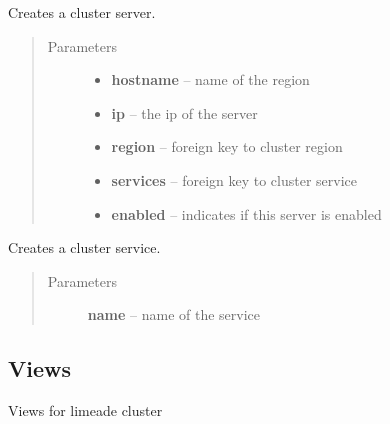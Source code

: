 \documentclass[letterpaper,10pt,english]{sphinxmanual}
\begin{document}
\begin{fulllineitems}
\label{api/cluster:limeade.cluster.models.Server}
Creates a cluster server.
\begin{quote}\begin{description}
\item[{Parameters}] \leavevmode\begin{itemize}
\item {} 
\textbf{hostname} -- name of the region

\item {} 
\textbf{ip} -- the ip of the server

\item {} 
\textbf{region} -- foreign key to cluster region

\item {} 
\textbf{services} -- foreign key to cluster service

\item {} 
\textbf{enabled} -- indicates if this server is enabled

\end{itemize}

\end{description}\end{quote}

\end{fulllineitems}


\begin{fulllineitems}
\label{api/cluster:limeade.cluster.models.Service}
Creates a cluster service.
\begin{quote}\begin{description}
\item[{Parameters}] \leavevmode
\textbf{name} -- name of the service

\end{description}\end{quote}

\end{fulllineitems}



\subsection{Views}
\label{api/cluster:module-limeade.cluster.views}\label{api/cluster:views}
Views for limeade cluster
\end{document}
